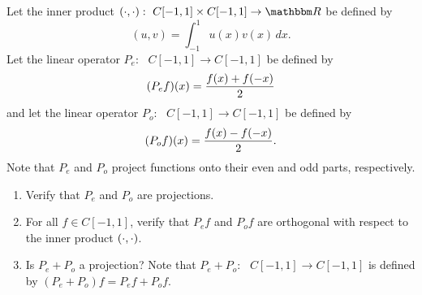 Let the inner product $\ip{\cdot,\cdot}:\mbox{ }C[-1,1]\times C[-1,1]\rightarrow\R$ be defined by
\[
(u,v) = \int_{-1}^1 u(x) v(x)\,dx.
\]
Let the linear operator $P_e:\mbox{ }C[-1,1]\rightarrow C[-1,1]$ be defined by
\[
(P_e f)(x) = {f(x) + f(-x) \over 2}
\]
and let the linear operator $P_o:\mbox{ }C[-1,1]\rightarrow C[-1,1]$ be defined by
\[
(P_o f)(x) = {f(x) - f(-x) \over 2}.
\]
Note that $P_e$ and $P_o$ project functions onto their even and odd parts, respectively.

\begin{enumerate}
\item Verify that $P_e$ and $P_o$ are projections.
\\
\item For all $f\in C[-1,1]$, verify that $P_e f$ and $P_o f$ are orthogonal with respect to the inner product $(\cdot,\cdot)$.
\\
\item Is $P_e+P_o$ a projection? Note that $P_e+P_o:\mbox{ }C[-1,1]\rightarrow C[-1,1]$ is defined by $(P_e+P_o)f=P_ef+P_of$.
\end{enumerate}


